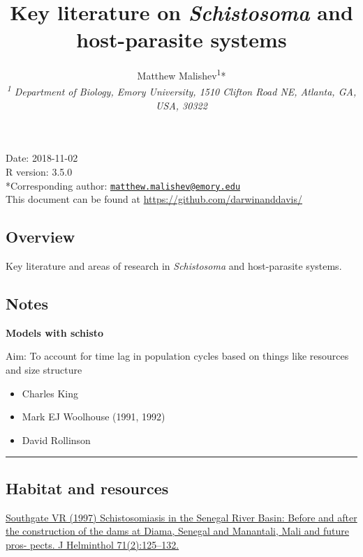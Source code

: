 \documentclass[10,portrait]{article}
\title{Key literature on \emph{Schistosoma} and host-parasite systems}
\author{Matthew
Malishev\textsuperscript{1}*\\[2\baselineskip]\emph{\textsuperscript{1}
Department of Biology, Emory University, 1510 Clifton Road NE, Atlanta,
GA, USA, 30322}}
\date{}
\providecommand{\tightlist}{%
  \setlength{\itemsep}{0pt}\setlength{\parskip}{0pt}}
\begin{document}
\maketitle

{
\hypersetup{linkcolor=black}
\setcounter{tocdepth}{3}
\tableofcontents
}
\newpage   

Date: 2018-11-02\\
R version: 3.5.0\\
*Corresponding author:
\href{mailto:matthew.malishev@emory.edu}{\nolinkurl{matthew.malishev@emory.edu}}\\
This document can be found at \url{https://github.com/darwinanddavis/}

\newpage  

\subsection{Overview}\label{overview}

Key literature and areas of research in \emph{Schistosoma} and
host-parasite systems.

\subsection{Notes}\label{notes}

\textbf{Models with schisto}

Aim: To account for time lag in population cycles based on things like
resources and size structure

\begin{itemize}
\tightlist
\item
  Charles King\\
\item
  Mark EJ Woolhouse (1991, 1992)\\
\item
  David Rollinson
\end{itemize}

\newpage  

\begin{center}\rule{0.5\linewidth}{\linethickness}\end{center}

\subsection{Habitat and resources}\label{habitat-and-resources}

\href{Southgate\%20VR\%20(1997)\%20Schistosomiasis\%20in\%20the\%20Senegal\%20River\%20Basin:\%20Before\%20and\%20after\%20the\%20construction\%20of\%20the\%20dams\%20at\%20Diama,\%20Senegal\%20and\%20Manantali,\%20Mali\%20and\%20future\%20pros-\%20pects.\%20J\%20Helminthol\%2071(2):125–132}{Southgate
VR (1997) Schistosomiasis in the Senegal River Basin: Before and after
the construction of the dams at Diama, Senegal and Manantali, Mali and
future pros- pects. J Helminthol 71(2):125--132.}
\end{document}
